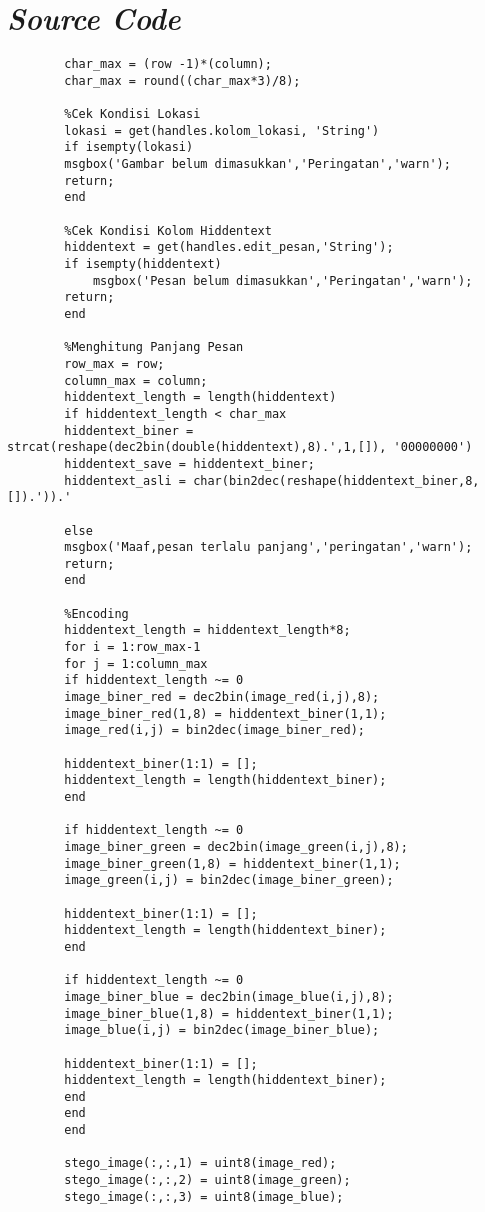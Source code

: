 \appendix 
\chapter{\emph{Source Code}}
	\begin{verbatim}
		char_max = (row -1)*(column);
		char_max = round((char_max*3)/8);
		
		%Cek Kondisi Lokasi
		lokasi = get(handles.kolom_lokasi, 'String')
		if isempty(lokasi) 
		msgbox('Gambar belum dimasukkan','Peringatan','warn');
		return;    
		end		
	
		%Cek Kondisi Kolom Hiddentext
		hiddentext = get(handles.edit_pesan,'String');
		if isempty(hiddentext)
			msgbox('Pesan belum dimasukkan','Peringatan','warn');
		return;    
		end
	
		%Menghitung Panjang Pesan
		row_max = row;
		column_max = column;
		hiddentext_length = length(hiddentext) 
		if hiddentext_length < char_max 
		hiddentext_biner = strcat(reshape(dec2bin(double(hiddentext),8).',1,[]), '00000000')
		hiddentext_save = hiddentext_biner;
		hiddentext_asli = char(bin2dec(reshape(hiddentext_biner,8,[]).')).'
		
		else
		msgbox('Maaf,pesan terlalu panjang','peringatan','warn');
		return;
		end
	
		%Encoding
		hiddentext_length = hiddentext_length*8;
		for i = 1:row_max-1
		for j = 1:column_max    
		if hiddentext_length ~= 0
		image_biner_red = dec2bin(image_red(i,j),8);
		image_biner_red(1,8) = hiddentext_biner(1,1);
		image_red(i,j) = bin2dec(image_biner_red); 
		
		hiddentext_biner(1:1) = [];  
		hiddentext_length = length(hiddentext_biner);            
		end
		
		if hiddentext_length ~= 0
		image_biner_green = dec2bin(image_green(i,j),8);
		image_biner_green(1,8) = hiddentext_biner(1,1);
		image_green(i,j) = bin2dec(image_biner_green);
		
		hiddentext_biner(1:1) = []; 
		hiddentext_length = length(hiddentext_biner); 
		end
		
		if hiddentext_length ~= 0
		image_biner_blue = dec2bin(image_blue(i,j),8);
		image_biner_blue(1,8) = hiddentext_biner(1,1); 
		image_blue(i,j) = bin2dec(image_biner_blue); 
		
		hiddentext_biner(1:1) = []; 
		hiddentext_length = length(hiddentext_biner); 
		end
		end
		end
		
		stego_image(:,:,1) = uint8(image_red);
		stego_image(:,:,2) = uint8(image_green);
		stego_image(:,:,3) = uint8(image_blue);
		

\end{verbatim}
